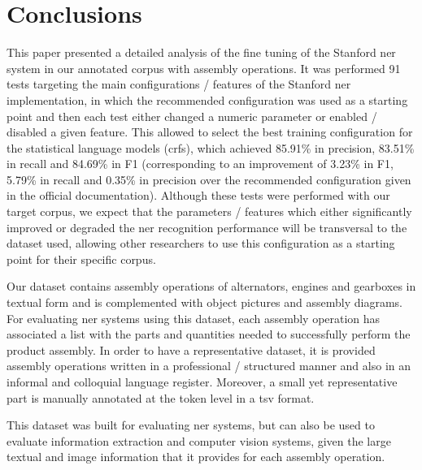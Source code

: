 \section{Conclusions}\label{sec:conclusions}

This paper presented a detailed analysis of the fine tuning of the Stanford \gls{ner} system in our annotated corpus with assembly operations. It was performed 91 tests targeting the main configurations / features of the Stanford \gls{ner} implementation, in which the recommended configuration was used as a starting point and then each test either changed a numeric parameter or enabled / disabled a given feature. This allowed to select the best training configuration for the statistical language models (\glspl{crf}), which achieved 85.91\% in precision, 83.51\% in recall and 84.69\% in F1 (corresponding to an improvement of 3.23\% in F1, 5.79\% in recall and 0.35\% in precision over the recommended configuration given in the official documentation). Although these tests were performed with our target corpus, we expect that the parameters / features which either significantly improved or degraded the \gls{ner} recognition performance will be transversal to the dataset used, allowing other researchers to use this configuration as a starting point for their specific corpus.

Our dataset contains assembly operations of alternators, engines and gearboxes in textual form and is complemented with object pictures and assembly diagrams. For evaluating \gls{ner} systems using this dataset, each assembly operation has associated a list with the parts and quantities needed to successfully perform the product assembly. In order to have a representative dataset, it is provided assembly operations written in a professional / structured manner and also in an informal and colloquial language register. Moreover, a small yet representative part is manually annotated at the token level in a \gls{tsv} format.

This dataset was built for evaluating \gls{ner} systems, but can also be used to evaluate information extraction and computer vision systems, given the large textual and image information that it provides for each assembly operation.
